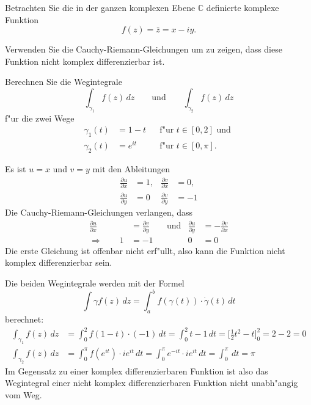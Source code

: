 Betrachten Sie die in der ganzen komplexen Ebene $\mathbb C$ definierte
komplexe Funktion
\[
f(z)=\bar z=x-iy.
\]
\begin{teilaufgaben}
\item
Verwenden Sie die Cauchy-Riemann-Gleichungen um zu zeigen, dass diese
Funktion nicht komplex differenzierbar ist.
\item
Berechnen Sie die Wegintegrale
\[
\int_{\gamma_1}f(z)\,dz
\qquad\text{und}\qquad
\int_{\gamma_2}f(z)\,dz
\]
f"ur die zwei Wege
\[
\begin{aligned}
\gamma_1(t)&=1-t    &&\text{f"ur $t\in[0,2]$ und }\\
\gamma_2(t)&=e^{it} &&\text{f"ur $t\in[0,\pi]$.}
\end{aligned}
\]
\end{teilaufgaben}

\begin{loesung}
\begin{teilaufgaben}
\item
Es ist $u=x$ und $v=y$ mit den Ableitungen
\[
\begin{aligned}
\frac{\partial u}{\partial x}&=1,&
\frac{\partial v}{\partial x}&=0,\\
\frac{\partial u}{\partial y}&=0&
\frac{\partial v}{\partial y}&=-1
\end{aligned}
\]
Die Cauchy-Riemann-Gleichungen verlangen, dass
\[
\begin{aligned}
\frac{\partial u}{\partial x}&=\frac{\partial v}{\partial y}
&&\text{und}&
\frac{\partial u}{\partial y}&=-\frac{\partial v}{\partial x}
\\
\Rightarrow\qquad
1&=-1&&&0&=0
\end{aligned}
\]
Die erste Gleichung ist offenbar nicht erf"ullt, also kann die Funktion
nicht komplex differenzierbar sein.
\item
Die beiden Wegintegrale werden mit der Formel
\[
\int\gamma f(z)\,dz = \int_a^b f(\gamma(t))\cdot \dot\gamma(t)\,dt
\]
berechnet:
\begin{align*}
\int_{\gamma_1}f(z) \,dz
&=
\int_0^2 f(1-t)\cdot (-1)\,dt
=
\int_0^2 t-1\,dt
=
\biggl[\frac12t^2-t\biggl]_0^2
=
2-2=0
\\
\int_{\gamma_2}f(z) \,dz
&=
\int_0^\pi f(e^{it})\cdot ie^{it}\,dt
=
\int_0^\pi e^{-it}\cdot ie^{it}\,dt
=
\int_0^\pi \,dt
=
\pi
\end{align*}
Im Gegensatz zu einer komplex differenzierbaren Funktion ist also das
Wegintegral einer nicht komplex differenzierbaren Funktion nicht
unabh"angig vom Weg.
\qedhere
\end{teilaufgaben}
\end{loesung}

